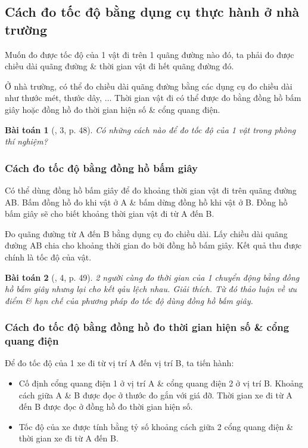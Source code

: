 \documentclass{article}
\newtheorem{baitoan}{Bài toán}
\begin{document}
\subsection{Cách đo tốc độ bằng dụng cụ thực hành ở nhà trường}
Muốn đo được tốc độ của 1 vật đi trên 1 quãng đường nào đó, ta phải đo được chiều dài quãng đường \& thời gian vật đi hết quãng đường đó.

Ở nhà trường, có thể đo chiều dài quãng đường bằng các dụng cụ đo chiều dài như thước mét, thước dây, $\ldots$ Thời gian vật đi có thể được đo bằng đồng hồ bấm giây hoặc đồng hồ đo thời gian hiện số \& cổng quang điện.

\begin{baitoan}[\cite{SGK_KHTN_7_Canh_Dieu}, 3, p. 48]
	Có những cách nào để đo tốc độ của 1 vật trong phòng thí nghiệm?
\end{baitoan}

\subsubsection{Cách đo tốc độ bằng đồng hồ bấm giây}
Có thể dùng đồng hồ bấm giây để đo khoảng thời gian vật đi trên quãng đường AB. Bấm đồng hồ đo khi vật ở A \& bấm dừng đồng hồ khi vật ở B. Đồng hồ bấm giây sẽ cho biết khoảng thời gian vật đi từ A đến B.

Đo quãng đường từ A đến B bằng dụng cụ đo chiều dài. Lấy chiều dài quãng đường AB chia cho khoảng thời gian đo bởi đồng hồ bấm giây. Kết quả thu được chính là tốc độ của vật.

\begin{baitoan}[\cite{SGK_KHTN_7_Canh_Dieu}, 4, p. 49]
	2 người cùng đo thời gian của 1 chuyển động bằng đồng hồ bấm giây nhưng lại cho kết qảu lệch nhau. Giải thích. Từ đó thảo luận về ưu điểm \& hạn chế của phương pháp đo tốc độ dùng đồng hồ bấm giây.
\end{baitoan}

\subsubsection{Cách đo tốc độ bằng đồng hồ đo thời gian hiện số \& cổng quang điện}
Để đo tốc độ của 1 xe đi từ vị trí A đến vị trí B, ta tiến hành:
\begin{itemize}
	\item Cố định cổng quang điện 1 ở vị trí A \& cổng quang điện 2 ở vị trí B. Khoảng cách giữa A \& B được đọc ở thước đo gắn với giá đỡ. Thời gian xe đi từ A đến B được đọc ở đồng hồ đo thời gian hiện số.
	\item Tốc độ của xe được tính bằng tỷ số khoảng cách giữa 2 cổng quang điện \& thời gian xe đi từ A đến B.
\end{itemize}
\end{document}
